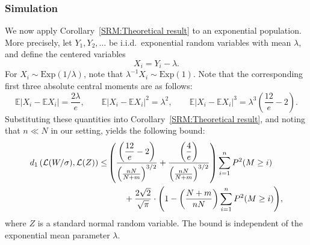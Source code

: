 \documentclass[pdflatex,sn-mathphys-ay]{sn-jnl}
\newcommand{\ncolor}[1]{\textcolor{blue}{#1}}  %
\newcommand{\E}{\mathbb{E}}
\theoremstyle{thmstyleone}%
\theoremstyle{thmstyletwo}%
\theoremstyle{thmstylethree}%
\begin{document}
\subsubsection{Simulation} 
We now apply Corollary~\ref{SRM:Theoretical result} to an exponential population. More precisely, let $Y_1,Y_2,\ldots$ be i.i.d.\ exponential random
variables with mean $\lambda$, and define the centered variables
\[
X_i = Y_i-\lambda.
\]
For $X_i\sim \mathrm{Exp}(1/\lambda)$, note that $\lambda^{-1} X_i\sim \mathrm{Exp}(1)$. 
Note that the corresponding first three absolute central moments are as follows:
\[
	\E|X_i-\E X_i| = \frac{2\lambda}{ e}, \qquad
    \E|X_i-\E X_i|^2 = {\lambda^2}, \qquad
    \E|X_i-\E X_i|^3 = {\lambda^3}\left(\frac{12}{e}-2\right).
	\]
    Substituting these quantities into Corollary~\ref{SRM:Theoretical result}, and noting that $n \ll N$  in our setting, yields the following bound:
    \begin{align} d_1\left(\mathcal{L}(W/\sigma), \mathcal{L}(Z) \right) \le &\left({\left( \dfrac{12}{e}-2\right) \over \left({nN\over N+m}\right)^{3/2}} +{\left( \dfrac{4}{e}\right)\over \left({nN\over N+m}\right)^{3/2}}\right)\sum_{i=1}^{n} P^2(M\ge i) \nonumber  \\&\quad \quad+{2\sqrt{2} \over \sqrt{\pi}}\cdot\displaystyle{\left(1- \left( \frac{N+m}{nN}\right)\sum_{i=1}^{n} P^2(M\ge i)\right)} \label{SRM:simulation result},\end{align} where $Z$ is a standard normal random variable. The bound is independent of the exponential mean parameter $\lambda$. 
    

 
\end{document}
